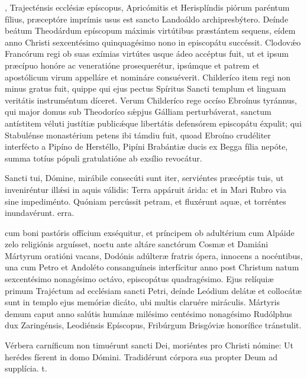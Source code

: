 \documentclass[fontsize=9pt,paper=A6,twoside,BCOR=1mm,DIV=22,headinclude]{scrarticle}
\begin{document}
\begin{multicols}{2}
, Trajecténsis ecclésiæ epíscopus, Apricómitis et Herisplíndis piórum paréntum fílius, præceptóre imprímis usus est sancto Landoáldo archipresbýtero. Deínde beátum Theodárdum epíscopum máximis virtútibus præstántem sequens, eídem anno Christi sexcentésimo quinquagésimo nono in episcopátu succéssit. Clodov\'æo Francórum regi ob suas exímias virtútes usque ádeo accéptus fuit, ut et ipsum præcípuo honóre ac veneratióne prosequerétur, ipsúmque et patrem et apostólicum virum appelláre et nomináre consuéverit. Childeríco item regi non minus gratus fuit, quippe qui ejus pectus Spíritus Sancti templum et linguam veritátis instruméntum díceret.
Verum Childeríco rege occíso Ebroínus tyránnus, qui major domus sub Theodoríco s\'æpjus Gálliam perturbáverat, sanctum antístitem véluti justítiæ public\'æque libertátis defensórem episcopátu éxpulit; qui Stabulénse monastérium petens ibi támdiu fuit, quoad Ebroíno crudéliter interfécto a Pipíno de Herstéllo, Pipíni Brabántiæ ducis ex Begga fília nepóte, summa totíus pópuli gratulatióne ab exsílio revocátur.

{
\R Sancti tui, Dómine, mirábile consecúti sunt iter, serviéntes præcéptis tuis, ut inveniréntur illǽsi in aquis válidis:
\red{*} Terra appáruit árida: et in Mari Rubro via sine impediménto.
\V Quóniam percússit petram, et fluxérunt aquæ, et torréntes inundavérunt.
erra.

 cum boni pastóris offícium exséquitur, et príncipem ob adultérium cum Alpáide zelo religiónis arguísset, noctu ante altáre sanctórum Cosmæ et Damiáni Mártyrum oratióni vacans, Dodónis adúlteræ fratris ópera, innocens a nocéntibus, una cum Petro et Andoléto consanguíneis interfícitur anno post Christum natum sexcentésimo nonagésimo octávo, episcopátus quadragésimo. Ejus relíquiæ primum Trajéctum ad ecclésiam sancti Petri, deínde Leódium delátæ et collocátæ sunt in templo ejus memóriæ dicáto, ubi multis claruére miráculis. Mártyris demum caput anno salútis humánæ milésimo centésimo nonagésimo Rudólphus dux Zaringénsis, Leodiénsis Epíscopus, Fribúrgum Brisgóviæ honorífice tránstulit.

\R Vérbera carníficum non timuérunt sancti Dei, moriéntes pro Christi nómine: \red{*} Ut herédes fíerent in domo Dómini.
\V Tradidérunt córpora sua propter Deum ad supplícia. t.

}
\end{multicols}
\end{document}
